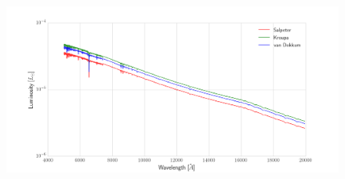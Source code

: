 \documentclass[12pt,usletter,english]{article}
\begin{document}
\begin{figure}[!h]
  \centering \includegraphics[width=13cm]{ssp_imfprofile.png}
  \caption{
    \label{fig:sspimf}}
\end{figure}
\end{document}
